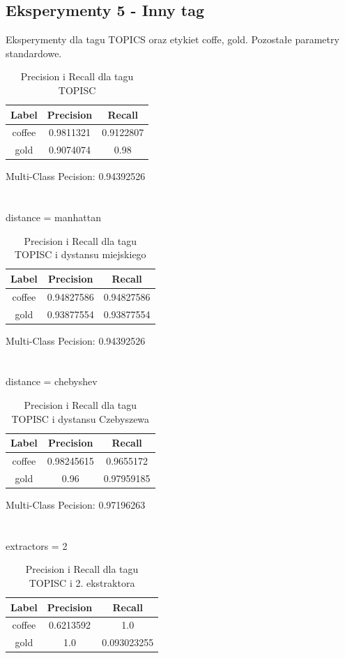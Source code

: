 \documentclass{classrep}
\begin{document}
\subsection{Eksperymenty 5 - Inny tag}
Eksperymenty dla tagu TOPICS oraz etykiet coffe, gold. Pozostałe parametry standardowe.
\begin{table}[H]
\begin{tabular}{|c|c|c|}
\hline
Label  & Precision & Recall    \\ \hline
coffee & 0.9811321 & 0.9122807 \\ \hline
gold   & 0.9074074 & 0.98      \\ \hline
\end{tabular}
\caption{Precision i Recall dla tagu TOPISC}
\end{table}
Multi-Class Pecision: 0.94392526\\
\\
\\
distance = manhattan
\begin{table}[H]
\begin{tabular}{|c|c|c|}
\hline
Label  & Precision  & Recall     \\ \hline
coffee & 0.94827586 & 0.94827586 \\ \hline
gold   & 0.93877554 & 0.93877554 \\ \hline
\end{tabular}
\caption{Precision i Recall dla tagu TOPISC i dystansu miejskiego}
\end{table}
Multi-Class Pecision: 0.94392526\\
\\
\\
distance = chebyshev
\begin{table}[H]
\begin{tabular}{|c|c|c|}
\hline
Label  & Precision  & Recall     \\ \hline
coffee & 0.98245615 & 0.9655172  \\ \hline
gold   & 0.96       & 0.97959185 \\ \hline
\end{tabular}
\caption{Precision i Recall dla tagu TOPISC i dystansu Czebyszewa}
\end{table}
Multi-Class Pecision: 0.97196263\\
\\
\\
extractors = 2
\begin{table}[H]
\begin{tabular}{|c|c|c|}
\hline
Label  & Precision & Recall      \\ \hline
coffee & 0.6213592 & 1.0         \\ \hline
gold   & 1.0       & 0.093023255 \\ \hline
\end{tabular}
\caption{Precision i Recall dla tagu TOPISC i 2. ekstraktora}
\end{table}
\end{document}
